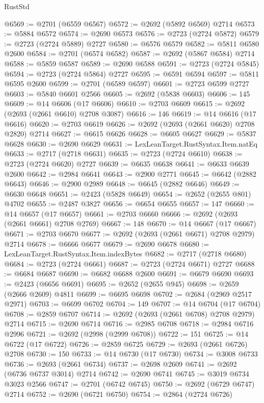 \begin{lexlean}{RustStd}
\begin{coremodule}
@6569 := @2701 (@6559 @6567)
@6572 := @2692 (@5892 @6569) @2714
@6573 := @5884 @6572
@6574 := @2690 @6573
@6576 := @2723 (@2724 @5872)
@6579 := @2723 (@2724 @5889) @2727
@6580 := @6576 @6579
@6582 := @5811 @6580 @2600
@6584 := @2701 (@6574 @6582)
@6587 := @2692 (@5867 @6584) @2714
@6588 := @5859 @6587
@6589 := @2690 @6588
@6591 := @2723 (@2724 @5845)
@6594 := @2723 (@2724 @5864) @2727
@6595 := @6591 @6594
@6597 := @5811 @6595 @2600
@6599 := @2701 (@6589 @6597)
@6601 := @2723 @6599 @2727
@6603 := @5840 @6601 @2566
@6605 := @2692 (@5838 @6603)
@6606 := 145
@6609 := @14 @6606 (@17 @6606)
@6610 := @2703 @6609
@6615 := @2692 (@2693 (@2661 @6610) @2708 @3087)
@6616 := 146
@6619 := @14 @6616 (@17 @6616)
@6620 := @2703 @6619
@6626 := @2692 (@2693 (@2661 @6620) @2708 @2820) @2714
@6627 := @6615 @6626
@6628 := @6605 @6627
@6629 := @5837 @6628
@6630 := @2690 @6629
@6631 := LexLeanTarget.RustSyntax.Item.natEq
@6633 := @2717 (@2718 @6631)
@6635 := @2723 (@2724 @6610)
@6638 := @2723 (@2724 @6620) @2727
@6639 := @6635 @6638
@6641 := @6633 @6639 @2600
@6642 := @2984 @6641
@6643 := @2900 @2771
@6645 := @6642 (@2882 @6643)
@6646 := @2900 @2989
@6648 := @6645 (@2882 @6646)
@6649 := @6630 @6648
@6651 := @2423 (@5828 @6649)
@6654 := @2652 (@2655 @801) @4702
@6655 := @2487 @3827
@6656 := @6654 @6655
@6657 := 147
@6660 := @14 @6657 (@17 @6657)
@6661 := @2703 @6660
@6666 := @2692 (@2693 (@2661 @6661) @2708 @2769)
@6667 := 148
@6670 := @14 @6667 (@17 @6667)
@6671 := @2703 @6670
@6677 := @2692 (@2693 (@2661 @6671) @2708 @2979) @2714
@6678 := @6666 @6677
@6679 := @2690 @6678
@6680 := LexLeanTarget.RustSyntax.Item.indexBytes
@6682 := @2717 (@2718 @6680)
@6684 := @2723 (@2724 @6661)
@6687 := @2723 (@2724 @6671) @2727
@6688 := @6684 @6687
@6690 := @6682 @6688 @2600
@6691 := @6679 @6690
@6693 := @2423 (@6656 @6691)
@6695 := @2652 (@2655 @945)
@6698 := @2659 (@2666 @2609) @4811
@6699 := @6695 @6698
@6702 := @2684 (@2969 @2517 @2971)
@6703 := @6699 @6702
@6704 := 149
@6707 := @14 @6704 (@17 @6704)
@6708 := @2859 @6707
@6714 := @2692 (@2693 (@2661 @6708) @2708 @2979) @2714
@6715 := @2690 @6714
@6716 := @2985 @6708
@6718 := @2984 @6716 @2996
@6721 := @2692 (@2998 (@2999 @6708))
@6722 := 151
@6725 := @14 @6722 (@17 @6722)
@6726 := @2859 @6725
@6729 := @2693 (@2661 @6726) @2708
@6730 := 150
@6733 := @14 @6730 (@17 @6730)
@6734 := @3008 @6733
@6736 := @2693 (@2661 @6734)
@6737 := @2698 @2609
@6741 := @2692 (@6736 @6737 @3014) @2714
@6742 := @2690 @6741
@6745 := @3019 @6734 @3023 @2566
@6747 := @2701 (@6742 @6745)
@6750 := @2692 (@6729 @6747) @2714
@6752 := @2690 (@6721 @6750)
@6754 := @2864 (@2724 @6726)

\end{coremodule}
\end{lexlean}
